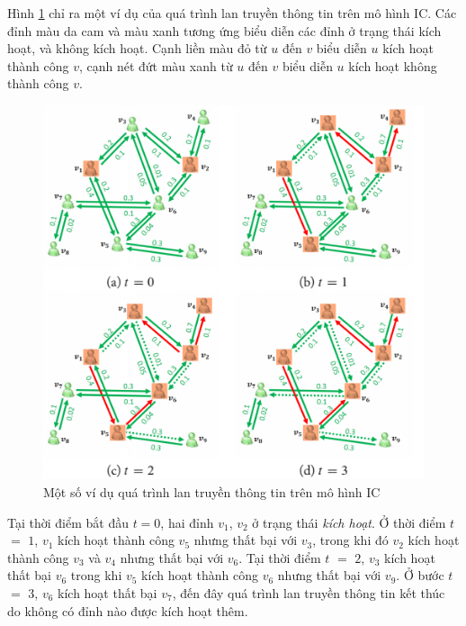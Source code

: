 	Hình \ref{refhinh2_1} chỉ ra một ví dụ của quá trình lan truyền thông tin trên mô hình IC. Các đỉnh màu da cam và màu xanh tương ứng biểu diễn các đỉnh ở trạng thái kích hoạt, và không kích hoạt. Cạnh liền màu đỏ từ $u$ đến $v$ biểu diễn $u$ kích hoạt thành công $v$, cạnh nét đứt màu xanh từ $u$ đến $v$ biểu diễn $u$ kích hoạt không thành công $v$.
		\begin{center}
			\begin{figure}[H]
				\begin{center}
					\includegraphics [scale=1]{picture/Hinh2_1}
				\end{center}
				\caption{Một số ví dụ quá trình lan truyền thông tin trên mô hình IC}
				\label{refhinh2_1}
			\end{figure}
		\end{center}
	
	Tại thời điểm bắt đầu $t=0$, hai đỉnh $v$$_{1}$, $v$$_{2}$ ở trạng thái {\itshape kích hoạt}. Ở thời điểm $t$ $=$ $1$, $v$$_{1}$ kích hoạt thành công $v$$_{5}$ nhưng thất bại với $v$$_{3}$, trong khi đó $v$$_{2}$ kích hoạt thành công $v$$_{3}$ và $v$$_{4}$ nhưng thất bại với $v$$_{6}$. Tại thời điểm $t$ $=$ $2$, $v$$_{3}$ kích hoạt thất bại $v$$_{6}$ trong khi $v$$_{5}$ kích hoạt thành công $v$$_{6}$ nhưng thất bại với $v$$_{9}$. Ở bước $t$ $=$ $3$, $v$$_{6}$ kích hoạt thất bại $v$$_{7}$, đến đây quá trình lan truyền thông tin kết thúc do không có đỉnh nào được kích hoạt thêm.
	
